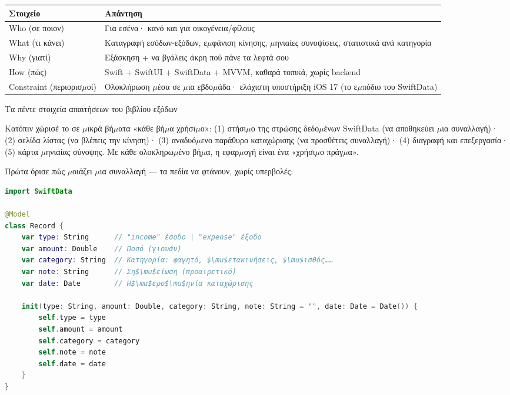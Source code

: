 


\begin{center}
\begin{tabularx}{\linewidth}{|X|X|}
\hline
\textbf{Στοιχείο} & \textbf{Απάντηση} \tabularnewline
\hline
Who (σε ποιον) & Για εσένα· κανό και για οικογένεια/φίλους \tabularnewline
What (τι κάνει) & Καταγραφή εσόδων-εξόδων, ε$\mu$φάνιση κίνησης, $\mu$ηνιαίες συνοψίσεις, στατιστικά ανά κατηγορία \tabularnewline
Why (γιατί) & Εξάσκηση + να βγάλεις άκρη πού πάνε τα λεφτά σου \tabularnewline
How (πώς) & Swift + SwiftUI + SwiftData + MVVM, καθαρά τοπικά, χωρίς backend \tabularnewline
Constraint (περιορισ$\mu$οί) & Ολοκλήρωση $\mu$έσα σε $\mu$ια εβδο$\mu$άδα· ελάχιστη υποστήριξη iOS 17 (το ε$\mu$πόδιο του SwiftData) \tabularnewline
\hline
\end{tabularx}
\end{center}

\begin{center}\small\color{gray}Τα πέντε στοιχεία απαιτήσεων του βιβλίου εξόδων\end{center}

Κατόπιν χώρισέ το σε $\mu$ικρά βή$\mu$ατα «κάθε βή$\mu$α χρήσι$\mu$ο»: (1) στήσι$\mu$ο της στρώσης δεδο$\mu$ένων SwiftData (να αποθηκεύει $\mu$ια συναλλαγή)· (2) σελίδα λίστας (να βλέπεις την κίνηση)· (3) αναδυό$\mu$ενο παράθυρο καταχώρισης (να προσθέτεις συναλλαγή)· (4) διαγραφή και επεξεργασία· (5) κάρτα $\mu$ηνιαίας σύνοψης. Με κάθε ολοκληρω$\mu$ένο βή$\mu$α, η εφαρ$\mu$ογή είναι ένα «χρήσι$\mu$ο πράγ$\mu$α».


Πρώτα όρισε πώς $\mu$οιάζει $\mu$ια συναλλαγή — τα πεδία να φτάνουν, χωρίς υπερβολές:

\begin{lstlisting}[language=Swift]
import SwiftData

@Model
class Record {
    var type: String      // "income" έσοδο | "expense" έξοδο
    var amount: Double    // Ποσό (γιουάν)
    var category: String  // Κατηγορία: φαγητό, $\mu$ετακινήσεις, $\mu$ισθός……
    var note: String      // Ση$\mu$είωση (προαιρετικό)
    var date: Date        // Η$\mu$ερο$\mu$ηνία καταχώρισης

    init(type: String, amount: Double, category: String, note: String = "", date: Date = Date()) {
        self.type = type
        self.amount = amount
        self.category = category
        self.note = note
        self.date = date
    }
}
\end{lstlisting}

